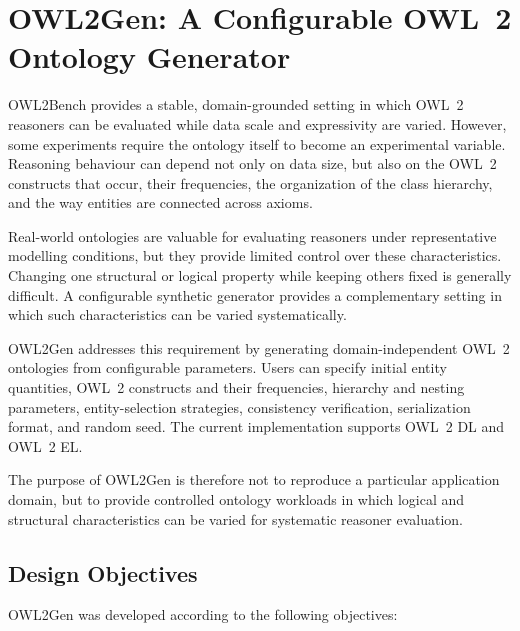 \section{OWL2Gen: A Configurable OWL~2 Ontology Generator}
\label{sec:OWL2Gen_intro}

OWL2Bench provides a stable, domain-grounded setting in which OWL~2
reasoners can be evaluated while data scale and expressivity are varied.
However, some experiments require the ontology itself to become an
experimental variable. Reasoning behaviour can depend not only on data
size, but also on the OWL~2 constructs that occur, their frequencies,
the organization of the class hierarchy, and the way entities are
connected across axioms.

Real-world ontologies are valuable for evaluating reasoners under
representative modelling conditions, but they provide limited control over
these characteristics. Changing one structural or logical property while
keeping others fixed is generally difficult. A configurable synthetic
generator provides a complementary setting in which such characteristics
can be varied systematically.

OWL2Gen addresses this requirement by generating domain-independent OWL~2
ontologies from configurable parameters. Users can specify initial entity
quantities, OWL~2 constructs and their frequencies, hierarchy and nesting
parameters, entity-selection strategies, consistency verification,
serialization format, and random seed. The current implementation supports
OWL~2 DL and OWL~2 EL.

The purpose of OWL2Gen is therefore not to reproduce a particular
application domain, but to provide controlled ontology workloads in which
logical and structural characteristics can be varied for systematic
reasoner evaluation.


\subsection{Design Objectives}
\label{OWL2Gen_design_considerations}

OWL2Gen was developed according to the following objectives:

